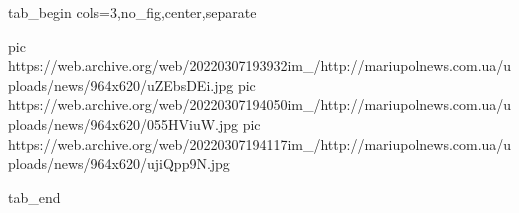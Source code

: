 
 
 
 
 

\ifcmt
  tab_begin cols=3,no_fig,center,separate

     pic https://web.archive.org/web/20220307193932im_/http://mariupolnews.com.ua/uploads/news/964x620/uZEbsDEi.jpg
		 pic https://web.archive.org/web/20220307194050im_/http://mariupolnews.com.ua/uploads/news/964x620/055HViuW.jpg
		 pic https://web.archive.org/web/20220307194117im_/http://mariupolnews.com.ua/uploads/news/964x620/ujiQpp9N.jpg

  tab_end
\fi
